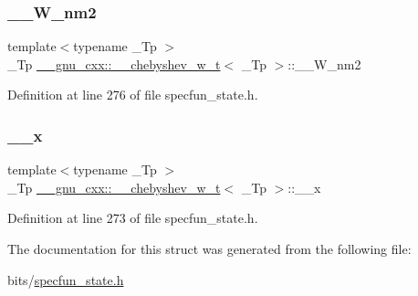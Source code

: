 \subsubsection{\texorpdfstring{\+\_\+\+\_\+\+W\+\_\+nm2}{\_\_W\_nm2}}
{\footnotesize\ttfamily template$<$typename \+\_\+\+Tp $>$ \\
\+\_\+\+Tp \hyperlink{struct____gnu__cxx_1_1____chebyshev__w__t}{\+\_\+\+\_\+gnu\+\_\+cxx\+::\+\_\+\+\_\+chebyshev\+\_\+w\+\_\+t}$<$ \+\_\+\+Tp $>$\+::\+\_\+\+\_\+\+W\+\_\+nm2}



Definition at line 276 of file specfun\+\_\+state.\+h.

\mbox{\label{struct____gnu__cxx_1_1____chebyshev__w__t_a812c1414d20763ecd27f95c244a727eb}} 
\subsubsection{\texorpdfstring{\+\_\+\+\_\+x}{\_\_x}}
{\footnotesize\ttfamily template$<$typename \+\_\+\+Tp $>$ \\
\+\_\+\+Tp \hyperlink{struct____gnu__cxx_1_1____chebyshev__w__t}{\+\_\+\+\_\+gnu\+\_\+cxx\+::\+\_\+\+\_\+chebyshev\+\_\+w\+\_\+t}$<$ \+\_\+\+Tp $>$\+::\+\_\+\+\_\+x}



Definition at line 273 of file specfun\+\_\+state.\+h.



The documentation for this struct was generated from the following file\+:\begin{DoxyCompactItemize}
\item 
bits/\hyperlink{specfun__state_8h}{specfun\+\_\+state.\+h}\end{DoxyCompactItemize}
